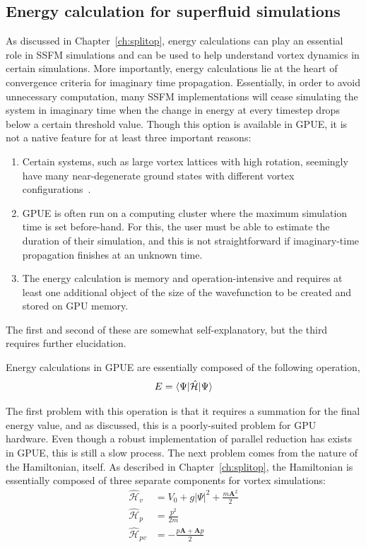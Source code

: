 \subsection{Energy calculation for superfluid simulations}

As discussed in Chapter~\ref{ch:splitop}, energy calculations can play an essential role in SSFM simulations and can be used to help understand vortex dynamics in certain simulations.
More importantly, energy calculations lie at the heart of convergence criteria for imaginary time propagation.
Essentially, in order to avoid unnecessary computation, many SSFM implementations will cease simulating the system in imaginary time when the change in energy at every timestep drops below a certain threshold value.
Though this option is available in GPUE, it is not a native feature for at least three important reasons:

\begin{enumerate}
\item Certain systems, such as large vortex lattices with high rotation, seemingly have many near-degenerate ground states with different vortex configurations~\cite{o2017, o2016, o2016topo}.
\item GPUE is often run on a computing cluster where the maximum simulation time is set before-hand.
For this, the user must be able to estimate the duration of their simulation, and this is not straightforward if imaginary-time propagation finishes at an unknown time.
\item The energy calculation is memory and operation-intensive and requires at least one additional object of the size of the wavefunction to be created and stored on GPU memory.
\end{enumerate}

\noindent The first and second of these are somewhat self-explanatory, but the third requires further elucidation.

Energy calculations in GPUE are essentially composed of the following operation,
\begin{equation}
E = \braket{\Psi|\mathcal{\hat H}|\Psi}
\end{equation}

\noindent The first problem with this operation is that it requires a summation for the final energy value, and as discussed, this is a poorly-suited problem for GPU hardware.
Even though a robust implementation of parallel reduction has exists in GPUE, this is still a slow process.
The next problem comes from the nature of the Hamiltonian, itself.
As described in Chapter~\ref{ch:splitop}, the Hamiltonian is essentially composed of three separate components for vortex simulations:
\begin{align}
\mathcal{\hat H}_v &= V_0 + g|\Psi|^2 + \frac{m\mathbf{A}^2}{2} \\
\mathcal{\hat H}_p &= \frac{p^2}{2m} \\
\mathcal{\hat H}_{pv} &= -\frac{p\mathbf{A} + \mathbf{A}p}{2}
\end{align}

